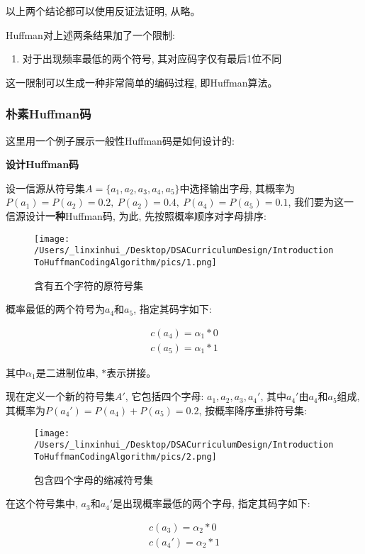 \documentclass{article}
\begin{document}
\begin{CJK}{UTF8}{gbsn}
以上两个结论都可以使用反证法证明, 从略。

Huffman对上述两条结果加了一个限制:

\begin{enumerate}
\def\labelenumi{\arabic{enumi}.}
\item
  对于出现频率最低的两个符号, 其对应码字仅有最后1位不同
\end{enumerate}

这一限制可以生成一种非常简单的编码过程, 即Huffman算法。

\subsubsection{朴素Huffman码}\label{header-n492}

这里用一个例子展示一般性Huffman码是如何设计的:

\textbf{设计Huffman码}

设一信源从符号集\(A = \{a_1, a_2, a_3, a_4, a_5\}\)中选择输出字母,
其概率为\(P(a_1) = P(a_2) = 0.2,\ P(a_2) = 0.4,\ P(a_4) = P(a_5) = 0.1\),
我们要为这一信源设计\textbf{一种}Huffman码, 为此,
先按照概率顺序对字母排序:

\begin{figure}[H]
\centering
\texttt{[image: /Users/\_linxinhui\_/Desktop/DSACurriculumDesign/IntroductionToHuffmanCodingAlgorithm/pics/1.png]}
\caption{含有五个字符的原符号集}
\end{figure}

概率最低的两个符号为\(a_4\)和\(a_5\), 指定其码字如下:

\begin{gather*}
c(a_4) = \alpha_1 * 0 \\
c(a_5) = \alpha_1 * 1
\end{gather*}

其中\(\alpha_1\)是二进制位串, \(*\)表示拼接。

现在定义一个新的符号集\(A'\), 它包括四个字母: \(a_1, a_2, a_3, a_4'\),
其中\(a_4'\)由\(a_4\)和\(a_5\)组成,
其概率为\(P(a_4') = P(a_4) + P(a_5) = 0.2\), 按概率降序重排符号集:

\begin{figure}[H]
\centering
\texttt{[image: /Users/\_linxinhui\_/Desktop/DSACurriculumDesign/IntroductionToHuffmanCodingAlgorithm/pics/2.png]}
\caption{包含四个字母的缩减符号集}
\end{figure}

在这个符号集中, \(a_3\)和\(a_4'\)是出现概率最低的两个字母,
指定其码字如下:

\begin{gather*}
c(a_3) = \alpha_2 * 0 \\
c(a_4') = \alpha_2 * 1
\end{gather*}


\end{CJK}
\end{document}
